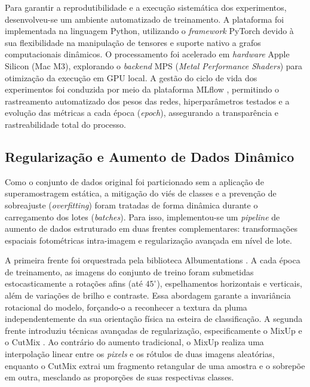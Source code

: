 
Para garantir a reprodutibilidade e a execução sistemática dos experimentos, desenvolveu-se um ambiente automatizado de treinamento. A plataforma foi implementada na linguagem Python, utilizando o \textit{framework} PyTorch \cite{paszke2017automatic} devido à sua flexibilidade na manipulação de tensores e suporte nativo a grafos computacionais dinâmicos. O processamento foi acelerado em \textit{hardware} Apple Silicon (Mac M3), explorando o \textit{backend} MPS (\textit{Metal Performance Shaders}) para otimização da execução em GPU local. A gestão do ciclo de vida dos experimentos foi conduzida por meio da plataforma MLflow \cite{mlflow}, permitindo o rastreamento automatizado dos pesos das redes, hiperparâmetros testados e a evolução das métricas a cada época (\textit{epoch}), assegurando a transparência e rastreabilidade total do processo.

\subsection{Regularização e Aumento de Dados Dinâmico}

    Como o conjunto de dados original foi particionado sem a aplicação de superamostragem estática, a mitigação do viés de classes e a prevenção de sobreajuste (\textit{overfitting}) foram tratadas de forma dinâmica durante o carregamento dos lotes (\textit{batches}). Para isso, implementou-se um \textit{pipeline} de aumento de dados estruturado em duas frentes complementares: transformações espaciais fotométricas intra-imagem e regularização avançada em nível de lote.

    A primeira frente foi orquestrada pela biblioteca Albumentations \cite{buslaev2020albumentations}. A cada época de treinamento, as imagens do conjunto de treino foram submetidas estocasticamente a rotações afins (até $45^\circ$), espelhamentos horizontais e verticais, além de variações de brilho e contraste. Essa abordagem garante a invariância rotacional do modelo, forçando-o a reconhecer a textura da pluma independentemente da sua orientação física na esteira de classificação. A segunda frente introduziu técnicas avançadas de regularização, especificamente o MixUp \cite{zhang2018mixup} e o CutMix \cite{yun2019cutmix}. Ao contrário do aumento tradicional, o MixUp realiza uma interpolação linear entre os \textit{pixels} e os rótulos de duas imagens aleatórias, enquanto o CutMix extrai um fragmento retangular de uma amostra e o sobrepõe em outra, mesclando as proporções de suas respectivas classes.

